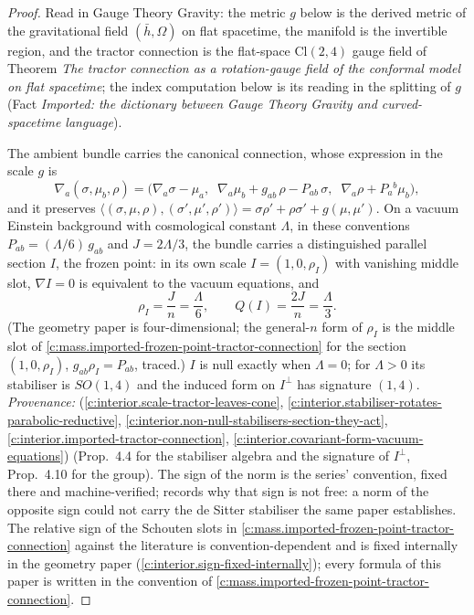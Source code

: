 \documentclass[11pt]{article}
\theoremstyle{definition}
\theoremstyle{plain}
\providecommand{\Cl}{}\renewcommand{\Cl}{\mathrm{Cl}}
\providecommand{\hb}{}\renewcommand{\hb}{\bar{h}}
\providecommand{\ip}{}\renewcommand{\ip}[2]{\langle #1, #2\rangle}
\begin{document}
\begin{proof}
Read in Gauge Theory Gravity: the metric $g$ below is the derived metric of the gravitational field $(\hb, \Omega)$ on flat spacetime, the manifold is the invertible region, and the tractor connection is the flat-space $\Cl(2,4)$ gauge field of Theorem \emph{The tractor connection as a rotation-gauge field of the conformal model on flat spacetime}; the index computation below is its reading in the splitting of $g$ (Fact \emph{Imported: the dictionary between Gauge Theory Gravity and curved-spacetime language}).

The ambient bundle carries the canonical connection, whose expression in the scale $g$ is
\begin{equation}
\nabla_{a}(\sigma, \mu_{b}, \rho) = \bigl(\nabla_{a}\sigma - \mu_{a},\;\; \nabla_{a}\mu_{b} + g_{ab}\,\rho - P_{ab}\,\sigma,\;\; \nabla_{a}\rho + P_{a}{}^{b}\mu_{b}\bigr),
\end{equation}
and it preserves $\ip{(\sigma,\mu,\rho)}{(\sigma',\mu',\rho')} = \sigma\rho' + \rho\sigma' + g(\mu,\mu')$. On a vacuum Einstein background with cosmological constant $\Lambda$, in these conventions $P_{ab} = (\Lambda/6)\,g_{ab}$ and $J = 2\Lambda/3$, the bundle carries a distinguished parallel section $I$, the frozen point: in its own scale $I = (1, 0, \rho_{I})$ with vanishing middle slot, $\nabla I = 0$ is equivalent to the vacuum equations, and
\[
\rho_{I} = \frac{J}{n} = \frac{\Lambda}{6}, \qquad Q(I) = \frac{2J}{n} = \frac{\Lambda}{3}.
\]
(The geometry paper is four-dimensional; the general-$n$ form of $\rho_{I}$ is the middle slot of \ref{c:mass.imported-frozen-point-tractor-connection} for the section $(1, 0, \rho_{I})$, $g_{ab}\rho_{I} = P_{ab}$, traced.) $I$ is null exactly when $\Lambda = 0$; for $\Lambda > 0$ its stabiliser is $SO(1,4)$ and the induced form on $I^{\perp}$ has signature $(1,4)$. \emph{Provenance:} \cite[Fact~4.1, Prop.~4.4, Thm.~4.5, Thm.~4.7, Prop.~4.10]{ButlerT6} (\ref{c:interior.scale-tractor-leaves-cone}, \ref{c:interior.stabiliser-rotates-parabolic-reductive}, \ref{c:interior.non-null-stabilisers-section-they-act}, \ref{c:interior.imported-tractor-connection}, \ref{c:interior.covariant-form-vacuum-equations}) (Prop.~4.4 for the stabiliser algebra and the signature of $I^{\perp}$, Prop.~4.10 for the group). The sign of the norm is the series' convention, fixed there and machine-verified; \cite[Rem.~4.9]{ButlerT6} records why that sign is not free: a norm of the opposite sign could not carry the de Sitter stabiliser the same paper establishes. The relative sign of the Schouten slots in \ref{c:mass.imported-frozen-point-tractor-connection} against the literature is convention-dependent and is fixed internally in the geometry paper \cite[Lem.~4.8]{ButlerT6} (\ref{c:interior.sign-fixed-internally}); every formula of this paper is written in the convention of \ref{c:mass.imported-frozen-point-tractor-connection}.

\end{proof}
\end{document}
